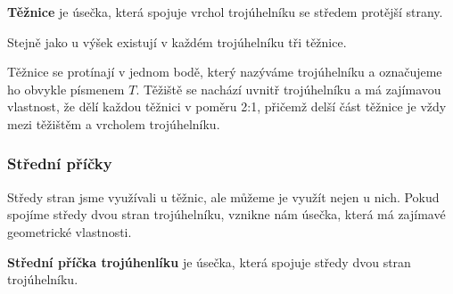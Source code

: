 \documentclass[12pt,a4paper]{article}
\begin{document}
\begin{definitionbox}
    \textbf{Těžnice} je úsečka, která spojuje vrchol trojúhelníku se středem protější strany.
\end{definitionbox}

Stejně jako u výšek existují v každém trojúhelníku tři těžnice.

\begin{center}
\end{center}

Těžnice se protínají v jednom bodě, který nazýváme  trojúhelníku a označujeme ho obvykle písmenem $T$.
Těžiště se nachází uvnitř trojúhelníku a má zajímavou vlastnost, že dělí každou těžnici v poměru 2:1, přičemž delší část těžnice je vždy mezi těžištěm a vrcholem trojúhelníku.

\subsubsection*{Střední příčky}

Středy stran jsme využívali u těžnic, ale můžeme je využít nejen u nich.
Pokud spojíme středy dvou stran trojúhelníku, vznikne nám úsečka, která má zajímavé geometrické vlastnosti.

\begin{definitionbox}
    \textbf{Střední příčka trojúhenlíku} je úsečka, která spojuje středy dvou stran trojúhelníku.
\end{definitionbox}
\end{document}
